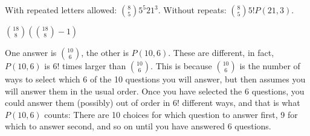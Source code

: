 \protect \documentclass [10pt]{exam}
\renewenvironment{Ans}[1]{\setcounter{question}{#1}\addtocounter{question}{-1}\question }{}
\begin{document}
\begin{questions}
\begin{Ans}{9}
\end{Ans}
\begin{Ans}{10}
		 With repeated letters allowed: ${8 \choose 5}5^5 21^3$.  Without repeats: ${8 \choose 5}5! P(21, 3)$.
	
\end{Ans}
\begin{Ans}{11}
	
\end{Ans}
\begin{Ans}{12}
		 ${18 \choose 8}\left({18 \choose 8} - 1\right)$
	
\end{Ans}
\begin{Ans}{13}
		 One answer is ${10 \choose 6}$, the other is $P(10, 6)$.  These are different, in fact, $P(10,6)$ is $6!$ times larger than ${10 \choose 6}$.  This is because ${10 \choose 6}$ is the number of ways to select which 6 of the 10 questions you will answer, but then assumes you will answer them in the usual order.  Once you have selected the 6 questions, you could answer them (possibly) out of order in 6! different ways, and that is what $P(10,6)$ counts: There are 10 choices for which question to answer first, 9 for which to answer second, and so on until you have answered 6 questions.
	
\end{Ans}
\begin{Ans}{14}
\end{Ans}
\end{questions}
\end{document}
